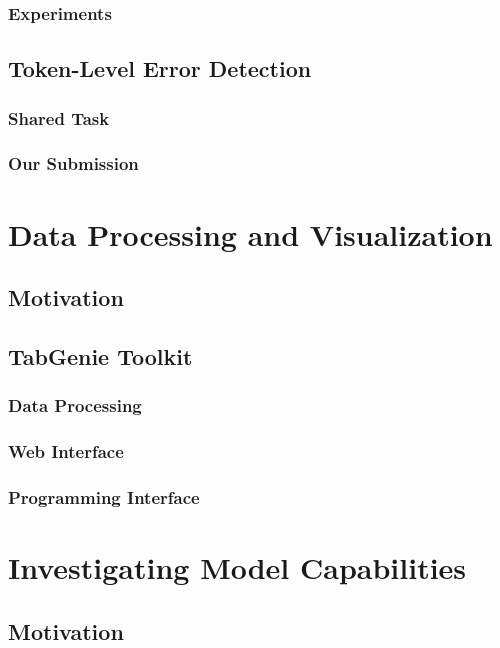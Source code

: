 \documentclass[12pt,notitlepage,a4paper,openright]{report}
\begin{document}
\subsection{Experiments}
\label{sec:sem-acc-exp}
\section{Token-Level Error Detection}
\label{sec:eval-token}
\subsection{Shared Task}
\label{sec:eval-st}
\subsection{Our Submission}
\label{sec:eval-ours}

\chapter{Data Processing and Visualization}
\label{chap:tabgenie}
\section{Motivation}
\label{sec:data-mot}
\section{TabGenie Toolkit}
\label{sec:tabgenie}
\subsection{Data Processing}
\label{sec:tabgenie-data}
\subsection{Web Interface}
\label{sec:tabgenie-web}
\subsection{Programming Interface}
\label{sec:tabgenie-cli}


\chapter{Investigating Model Capabilities}
\label{chap:investigating}
\section{Motivation}
\label{sec:investigating-mot}
\end{document}
